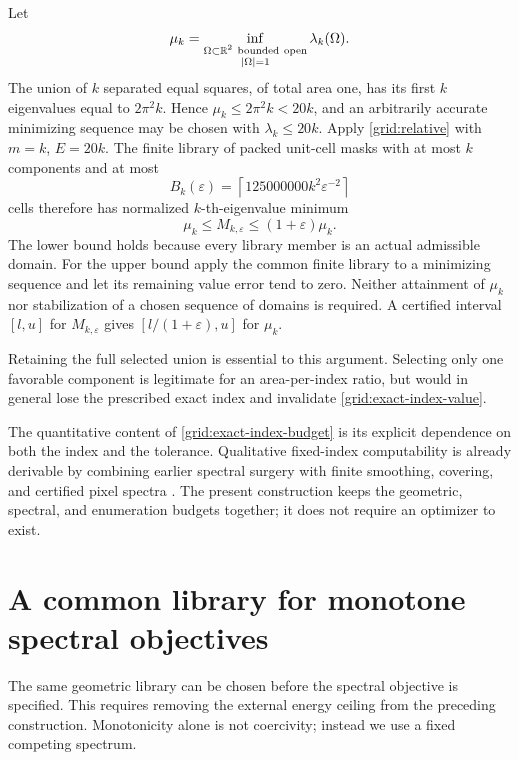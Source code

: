 \documentclass[11pt,reqno]{amsart}
\numberwithin{equation}{section}
\newcommand{\R}{\mathbb R}
\newcommand{\abs}[1]{\lvert#1\rvert}
\newcommand{\Om}{\Omega}
\begin{document}
Let
\[
 \mu_k=\inf_{\substack{\Om\subset\R^2\ {\rm bounded\ open}\\
                         \abs\Om=1}}\lambda_k(\Om).
\]
The union of \(k\) separated equal squares, of total area one, has
its first \(k\) eigenvalues equal to \(2\pi^2k\).  Hence
\(\mu_k\le2\pi^2k<20k\), and an arbitrarily accurate minimizing
sequence may be chosen with \(\lambda_k\le20k\).
Apply \eqref{grid:relative} with \(m=k\), \(E=20k\).  The finite
library of packed unit-cell masks with at most \(k\) components and
at most
\begin{equation}
 B_k(\varepsilon)
   =\left\lceil125000000k^2\varepsilon^{-2}\right\rceil
 \label{grid:exact-index-budget}
\end{equation}
cells therefore has normalized \(k\)-th-eigenvalue minimum
\begin{equation}
 \mu_k\le M_{k,\varepsilon}\le(1+\varepsilon)\mu_k.
 \label{grid:exact-index-value}
\end{equation}
The lower bound holds because every library member is an actual
admissible domain.  For the upper bound apply the common finite
library to a minimizing sequence and let its remaining value error
tend to zero.  Neither attainment of \(\mu_k\) nor stabilization of
a chosen sequence of domains is required.  A certified interval
\([l,u]\) for \(M_{k,\varepsilon}\) gives
\([l/(1+\varepsilon),u]\) for \(\mu_k\).

Retaining the full selected union is essential to this argument.
Selecting only one favorable component is legitimate for an
area-per-index ratio, but would in general lose the prescribed
exact index and invalidate \eqref{grid:exact-index-value}.

The quantitative content of \eqref{grid:exact-index-budget} is its
explicit dependence on both the index and the tolerance.  Qualitative
fixed-index computability is already derivable by combining earlier
spectral surgery with finite smoothing, covering, and certified pixel
spectra \cite{BucurMazzoleni2015,RoslerStepanenko2024}.  The present
construction keeps the geometric, spectral, and enumeration budgets
together; it does not require an optimizer to exist.

\section{A common library for monotone spectral objectives}\label{sec:objectives}

The same geometric library can be chosen before the spectral
objective is specified. This requires removing the external energy
ceiling from the preceding construction. Monotonicity alone is not
coercivity; instead we use a fixed competing spectrum.
\end{document}
